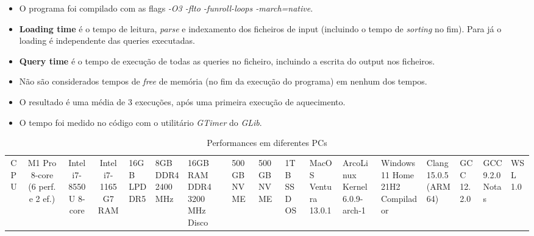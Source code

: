 \documentclass{article}
\begin{document}
            \begin{itemize}
                \item O programa foi compilado com as flags \emph{-O3 -flto -funroll-loops -march=native}.
                \item \textbf{Loading time} é o tempo de leitura, \emph{parse} e indexamento dos 
                ficheiros de input (incluindo o tempo de \emph{sorting} no fim).
                Para já o loading é independente das queries executadas.
                \item \textbf{Query time} é o tempo de execução de todas as queries no ficheiro,
                incluindo a escrita do output nos ficheiros.
                \item Não são considerados tempos de \emph{free} de memória (no fim da execução
                do programa) em nenhum dos tempos.
                \item O resultado é uma média de 3 execuções, após uma primeira execução de aquecimento. 
                \item O tempo foi medido no código com o utilitário \emph{GTimer} do \emph{GLib}.
            \end{itemize}
            
            \begin{table}[hbt!]
                \centering
                \begin{tabular}{|*{4}{c|}}
                    \hline
                    & &&\\
                    \hline
                    CPU        & M1 Pro 8-core (6 perf. e 2 ef.) & Intel i7-8550U 8-core         & Intel i7-1165G7
                    RAM        & 16GB LPDDR5                     & 8GB DDR4 2400MHz              & 16GB RAM DDR4 3200 MHz
                    Disco      & 500GB NVME                      & 500GB NVME                    & 1TB SSD
                    OS         & MacOS Ventura 13.0.1            & ArcoLinux Kernel 6.0.9-arch-1 & Windows 11 Home 21H2
                    Compilador & Clang 15.0.5 (ARM64)            & GCC 12.2.0                    & GCC 9.2.0
                    Notas                                                                        & WSL 1.0
                    \hline
                \end{tabular}
                \caption{Performances em diferentes PCs}
            \end{table}
            
\end{document}
